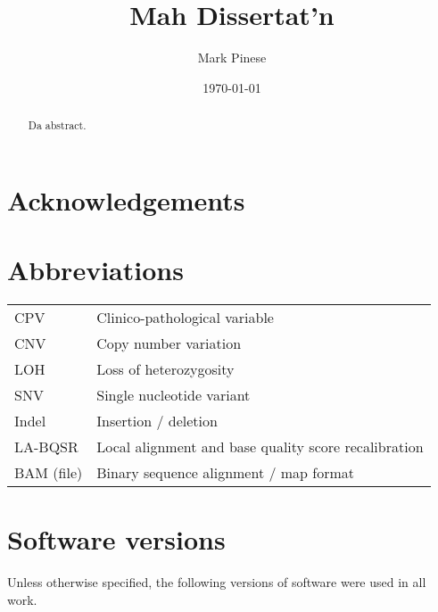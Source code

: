 \documentclass[11pt,a4paper]{report}
\begin{document}
\pagestyle{empty}

\title{Mah Dissertat'n}
\author{Mark Pinese}
\date{\today}

\maketitle



\chapter*{Acknowledgements}
\thispagestyle{empty}

\begin{abstract}
Da abstract.
\end{abstract}

\setcounter{page}{1}
\tableofcontents
\listoffigures
\listoftables

\chapter*{Abbreviations}


\begin{tabular}[c]{ l | l }
  CPV           & Clinico-pathological variable \\
  CNV           & Copy number variation \\
  LOH           & Loss of heterozygosity \\
  SNV           & Single nucleotide variant \\
  Indel         & Insertion / deletion \\
  LA-BQSR       & Local alignment and base quality score recalibration \\
  BAM (file)    & Binary sequence alignment / map format \\
\end{tabular}


\chapter*{Software versions}
Unless otherwise specified, the following versions of software were used in all work.
\end{document}
